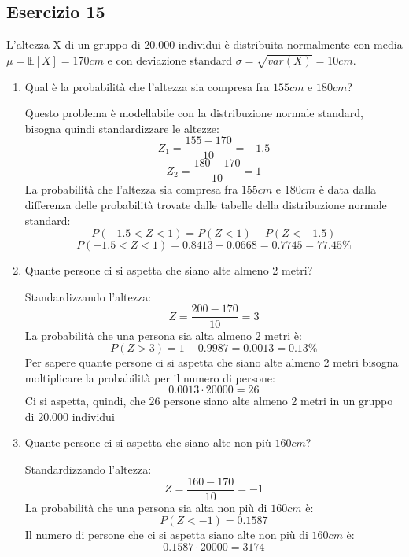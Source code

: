 \documentclass[a4paper]{article}
\theoremstyle{break}
\theoremstyle{break}
\theoremstyle{break}
\theoremstyle{break}
\begin{document}
\subsection{Esercizio 15}
L'altezza X di un gruppo di 20.000 individui è distribuita normalmente con media
\( \mu = \mathbb{E}[X] = 170cm \) e con deviazione standard \( \sigma = \sqrt{var(X)} = 10cm  \).
\begin{enumerate}
  \item Qual è la probabilità che l'altezza sia compresa fra \( 155cm \) e \( 180cm \)?

    \vspace{1em}
    Questo problema è modellabile con la distribuzione normale standard, bisogna quindi
    standardizzare le altezze:
    \[
    Z_1 = \frac{155 - 170}{10} = -1.5
    \] 
    \[
    Z_2 = \frac{180 - 170}{10} = 1
    \] 
    La probabilità che l'altezza sia compresa fra \( 155cm \) e \( 180cm \) è data dalla
    differenza delle probabilità trovate dalle tabelle della distribuzione normale standard:
    \[
    P(-1.5 < Z < 1) = P(Z < 1) - P(Z < -1.5) 
    \] 
    \[
    P(-1.5 < Z < 1) = 0.8413 - 0.0668 = 0.7745 = 77.45\%
    \] 
  \item Quante persone ci si aspetta che siano alte almeno 2 metri?

    \vspace{1em}
    Standardizzando l'altezza:
    \[
    Z = \frac{200 - 170}{10} = 3
    \]
    La probabilità che una persona sia alta almeno 2 metri è:
    \[
    P(Z > 3) = 1 - 0.9987 = 0.0013 = 0.13\%
    \]
    Per sapere quante persone ci si aspetta che siano alte almeno 2 metri bisogna moltiplicare
    la probabilità per il numero di persone:
    \[
    0.0013 \cdot 20000 = 26
    \]
    Ci si aspetta, quindi, che 26 persone siano alte almeno 2 metri in un gruppo di 20.000
    individui
  \item Quante persone ci si aspetta che siano alte non più \( 160cm \)?

    \vspace{1em}
    Standardizzando l'altezza:
    \[
      Z = \frac{160 - 170}{10} = -1
    \] 
    La probabilità che una persona sia alta non più di \( 160cm \) è:
    \[
      P(Z < -1) = 0.1587
    \]
    Il numero di persone che ci si aspetta siano alte non più di \( 160cm \) è:
    \[
      0.1587 \cdot 20000 = 3174
    \]
\end{enumerate}
\end{document}
